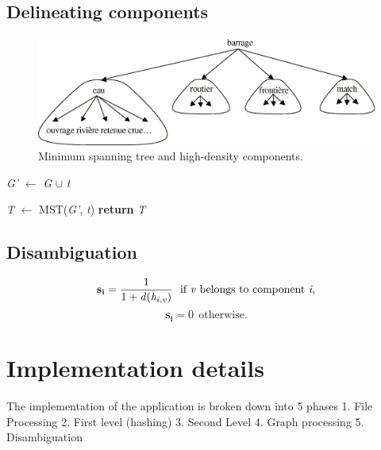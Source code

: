 \documentclass[article,dr=phil,type=drfinal,colorback,accentcolor=tud9c]{tudthesis}
\begin{document}
\subsection{Delineating components}
\begin{figure}[htb]
	\centering
	\includegraphics[]{images/delineate}
	\caption[Minimum spanning tree and high-density components.]{Minimum spanning tree and high-density components.}
	\label{fig:delineate}
\end{figure}


\begin{algorithm}[H]
	

 \textit{G'} $\leftarrow$ \textit{G} $\cup$ \textit{t} \;
 
 \textit{T} $\leftarrow$ MST(\textit{G'}, \textit{t}) \newline
 \textbf{return} \textit{T}
\end{algorithm}

\subsection{Disambiguation}

\[ \mathbf{s_i} = \frac{1}{1 + \mathit{d}(\mathit{h_{i,v}})} \ \ \textrm{if \textit{v} belongs to component \textit{i},}\] 
\[ \mathbf{s_i} = 0 \ \ \textrm{otherwise.} \]


\newpage
\section{Implementation details}
The implementation of the application is broken down into 5 phases
1. File Processing
2. First level (hashing)
3. Second Level
4. Graph processing
5. Disambiguation
\newpage
\end{document}

